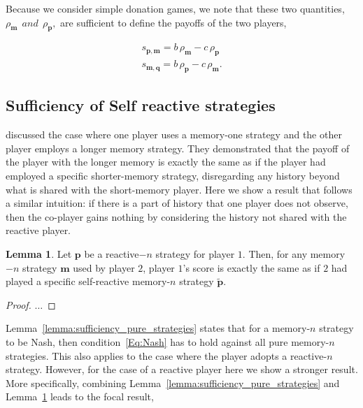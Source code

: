 \documentclass{article}
\theoremstyle{definition}
\newtheorem{lemma}[theorem]{Lemma}
\begin{document}
Because we consider simple donation games, we note that these two quantities,
$\rho_\mathbf{m}  ~~and~~ \rho_\mathbf{p},$ are
sufficient to define the payoffs of the two players,

\begin{equation} \label{Eq:payoff}
  \begin{array}{lll}
  s_{\mathbf{p}, \mathbf{m}}  =  b\, \rho_\mathbf{m} - c\, \rho_\mathbf{p}\\
  s_{\mathbf{m}, \mathbf{q}} = b\, \rho_\mathbf{p} - c\, \rho_\mathbf{m}.
  \end{array}
\end{equation}

\subsection{Sufficiency of Self reactive strategies}\label{section:self_reactive_sufficiency}

\cite{press:PNAS:2012} discussed the case where one player uses a memory-one
strategy and the other player employs a longer memory strategy. They
demonstrated that the payoff of the player with the longer memory is exactly the
same as if the player had employed a specific shorter-memory strategy,
disregarding any history beyond what is shared with the short-memory player.
Here we show a result that follows a similar intuition: if there is a part of
history that one player does not observe, then the co-player gains nothing by
considering the history not shared with the reactive player.

\begin{lemma}\label{lemma:self_reactive_sufficiency}
  Let $\mathbf{p}$ be a reactive$-n$ strategy for player $1$. Then, for any
  memory$-n$ strategy $\mathbf{m}$ used by player $2$, player $1$'s score is
  exactly the same as if $2$ had played a specific self-reactive memory-$n$
  strategy $\mathbf{\tilde{p}}$.
\end{lemma}

\begin{proof}
$\dots$
\end{proof}

Lemma~\ref{lemma:sufficiency_pure_strategies} states that for a memory-$n$
strategy to be Nash, then condition~\eqref{Eq:Nash} has to hold against all pure
memory-$n$ strategies. This also applies to the case where the player adopts a
reactive-$n$ strategy. However, for the case of a reactive player here we show a
stronger result. More specifically, combining
Lemma~\ref{lemma:sufficiency_pure_strategies} and
Lemma~\ref{lemma:self_reactive_sufficiency} leads to the focal result,
\end{document}
